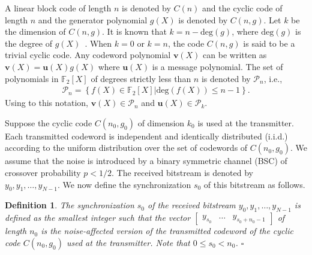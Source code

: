 \documentclass[10pt,journal]{IEEEtran}
\newtheorem{definition}{Definition}
\def \deg{{\mathrm{deg}}}
\begin{document}
A linear block code of length $n$ is denoted by $C(n)$ and the cyclic code of length $n$ and the generator polynomial $g(X)$ is denoted by 
$C(n,g)$. 
Let $k$ be the dimension of $C(n,g)$.
It is known that $k = n - \deg(g)$, where $\deg(g)$ is the degree of $g(X)$~\cite{LinCostello2004}.
When $k=0$ or $k=n$, the code $C(n,g)$ is said to be a trivial cyclic code.
% 
% 
Any codeword polynomial $\mathbf{v}(X)$ can be written as $\mathbf{v}(X) = \mathbf{u}(X)g(X)$
where $\mathbf{u}(X)$ is a message polynomial.
% 
The set of polynomials in $\mathbb{F}_2[X]$ of degrees strictly less than $n$ is denoted by $\mathcal{P}_n$, i.e., 
% 
\begin{align}
% 
\mathcal{P}_n = \left\{f(X) \in \mathbb{F}_2[X] \Big| \mathrm{deg}(f(X)) \leq n-1\right\}.
% 
\end{align}
% 
Using to this notation, $\mathbf{v}(X) \in \mathcal{P}_{n}$ and $\mathbf{u}(X) \in \mathcal{P}_{k}$.

Suppose the cyclic code $C(n_0,g_0)$ of dimension $k_0$ is used at the transmitter.
Each transmitted codeword is independent and identically distributed (i.i.d.) according to the uniform distribution
over the set of codewords of $C(n_0,g_0)$.
% 
We assume that the noise is introduced by a binary symmetric channel (BSC) of crossover probability $p < 1/2$. 
The received bitstream is denoted by $y_0, y_1, \ldots , y_{N-1}$.
We now define the synchronization $s_0$ of this bitstream as follows.

% 
\begin{definition}
\label{Definition_sync}
% 
The synchronization $s_0$ of the received bitstream $y_0, y_1, \ldots , y_{N-1}$ is defined as the 
smallest integer such that the vector $\begin{bmatrix} y_{s_0} & \ldots & y_{s_0+n_0-1} \end{bmatrix}$ of length $n_0$
is the noise-affected version of the transmitted codeword of the cyclic code $C(n_0,g_0)$ used at the transmitter. 
Note that $0 \leq s_0 < n_0$.
\hfill $\square$
% 
\end{definition}
% 
\end{document}
